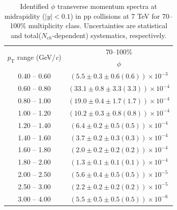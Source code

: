 \begin{table}
\caption{Identified $\phi$ transverse momentum spectra at midrapidity ($|y|<0.1$) in pp collisions at 7 TeV for 70--100\% multiplicity class. Uncertainties are statistical and total($N_{ch}$-dependent) systematics, respectively.}
\label{tab:Phi_70to100}
\begin{center}
\begin{tabular}{ c | c }
\hline
\multirow{2}{*}{$p_{\mathrm{T}}$ range (GeV/\textit{c})} & \multicolumn{1}{c}{70--100\%} \\ & $\phi$\\ 
\hline
0.40 -- 0.60 & $(5.5\pm0.3\pm0.6(0.6))\times10^{-3}$ \\ 
0.60 -- 0.80 & $(33.1\pm0.8\pm3.3(3.3))\times10^{-4}$ \\ 
0.80 -- 1.00 & $(19.0\pm0.4\pm1.7(1.7))\times10^{-4}$ \\ 
1.00 -- 1.20 & $(10.2\pm0.3\pm0.8(0.8))\times10^{-4}$ \\ 
1.20 -- 1.40 & $(6.4\pm0.2\pm0.5(0.5))\times10^{-4}$ \\ 
1.40 -- 1.60 & $(3.7\pm0.2\pm0.3(0.3))\times10^{-4}$ \\ 
1.60 -- 1.80 & $(2.0\pm0.2\pm0.2(0.2))\times10^{-4}$ \\ 
1.80 -- 2.00 & $(1.3\pm0.1\pm0.1(0.1))\times10^{-4}$ \\ 
2.00 -- 2.50 & $(5.6\pm0.4\pm0.5(0.5))\times10^{-5}$ \\ 
2.50 -- 3.00 & $(2.2\pm0.2\pm0.2(0.2))\times10^{-5}$ \\ 
3.00 -- 4.00 & $(5.5\pm0.5\pm0.5(0.5))\times10^{-6}$ \\ 
\hline
\end{tabular}
\end{center}
\end{table}
 
